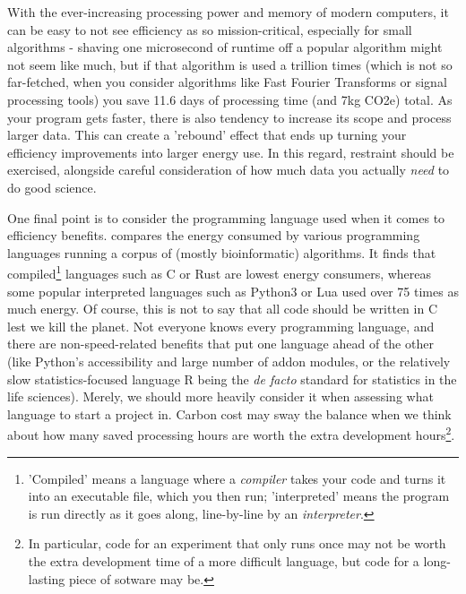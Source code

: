 \documentclass{article}
\begin{document}
With the ever-increasing processing power and memory of modern computers, it can be easy to not see efficiency as so mission-critical, especially for small algorithms - shaving one microsecond of runtime off a popular algorithm might not seem like much, but if that algorithm is used a trillion times (which is not so far-fetched, when you consider algorithms like Fast Fourier Transforms or signal processing tools) you save 11.6 days of processing time (and 7kg CO2e) total.  As your program gets faster, there is also tendency to increase its scope and process larger data. This can create a 'rebound' effect \citep{lannelongue2021ten} that ends up turning your efficiency improvements into larger energy use. In this regard, restraint should be exercised, alongside careful consideration of how much data you actually \emph{need} to do good science.\newline

One final point is to consider the programming language used when it comes to efficiency benefits. \citet{pereira2017energy} compares the energy consumed by various programming languages running a corpus of (mostly bioinformatic) algorithms. It finds that compiled\footnote{'Compiled' means a language where a \emph{compiler} takes your code and turns it into an executable file, which you then run; 'interpreted' means the program is run directly as it goes along, line-by-line by an \emph{interpreter}.} languages such as C or Rust are lowest energy consumers, whereas some popular interpreted languages such as Python3 or Lua used over 75 times as much energy. Of course, this is not to say that all code should be written in C lest we kill the planet. Not everyone knows every programming language, and there are non-speed-related benefits that put one language ahead of the other (like Python's accessibility and large number of addon modules, or the relatively slow statistics-focused language R being the \textit{de facto} standard for statistics in the life sciences). Merely, we should more heavily consider it when assessing what language to start a project in. Carbon cost may sway the balance when we think about how many saved processing hours are worth the extra development hours\footnote{In particular, code for an experiment that only runs once may not be worth the extra development time of a more difficult language, but code for a long-lasting piece of sotware may be.}. \newline
\end{document}
